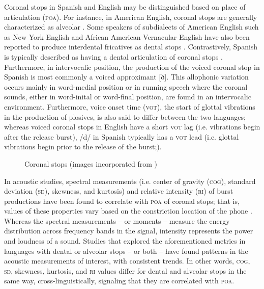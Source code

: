 \documentclass[output=paper,colorlinks,citecolor=brown,
]{langscibook}
\begin{document}
Coronal stops in Spanish and English may be distinguished based on place of articulation (\textsc{poa}). For instance, in American English, coronal stops are generally characterized as alveolar \citep[see ]{hammond1999phonology}. Some speakers of subdialects of American English such as New York English and African American Vernacular English have also been reported to produce interdental fricatives as dental stops \citep{gordon2008new,green2002african}. Contrastively, Spanish is typically described as having a dental articulation of coronal stops \citep[see ]{hualde2005sounds}. Furthermore, in intervocalic position, the production of the voiced coronal stop in Spanish is most commonly a voiced approximant [ð]. This allophonic variation occurs mainly in word-medial position or in running speech where the coronal sounds, either in word-inital or word-final position, are found in an intervocalic environment. Furthermore, voice onset time (\textsc{vot}), the start of glottal vibrations in the production of plosives, is also said to differ between the two languages; whereas voiced coronal stops in English have a short \textsc{vot} lag (i.e. vibrations begin after the release burst), /d/ in Spanish typically has a \textsc{vot} lead (i.e. glottal vibrations begin prior to the release of the burst;)\citep{lisker1964cross,keating1984phonetic}.

\begin{figure}
    \qquad
    \caption{Coronal stops (images incorporated from \citealt{mannell2001pic})}%
    \label{fig:gutierrez:coronal_stops}%
\end{figure}

In acoustic studies, spectral measurements (i.e. center of gravity (\textsc{cog}), standard deviation (\textsc{sd}), skewness, and kurtosis) and relative intensity (\textsc{ri}) of burst productions have been found to correlate with \textsc{poa} of coronal stops; that is, values of these properties vary based on the constriction location of the phone \citep{jongman1985acoustic,sundara2005acoustic,sundara2006production,sundara2008discrimination}. Whereas the spectral measurements -- or moments -- measure the energy distribution across frequency bands in the signal, intensity represents the power and loudness of a sound. Studies that explored the aforementioned metrics in languages with dental or alveolar stops -- or both -- have found patterns in the acoustic measurements of interest, with consistent trends. In other words, \textsc{cog}, \textsc{sd}, skewness, kurtosis, and \textsc{ri} values differ for dental and alveolar stops in the same way, cross-linguistically, signaling that they are correlated with \textsc{poa}.
\end{document}
